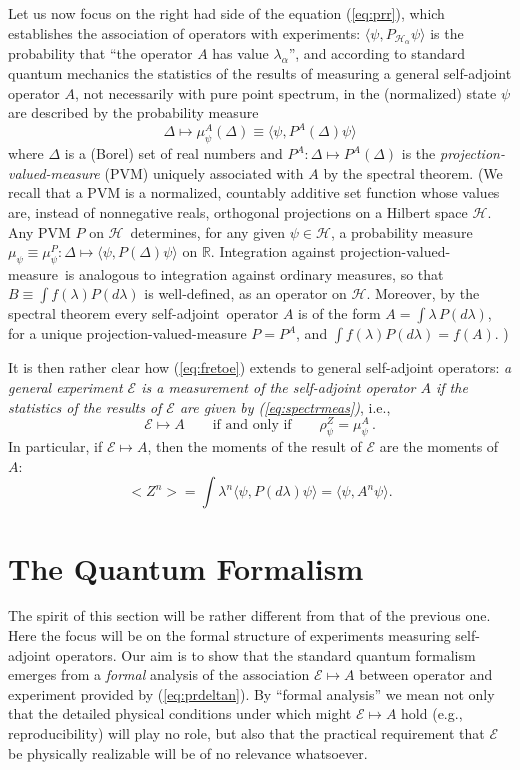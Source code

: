 \documentclass[12pt]{article}
\newcommand{\sa}{self-adjoint}
\newcommand{\PV}{projection-valued-measure}
\renewcommand{\a}{\alpha}
\newcommand{\la}{\lambda_{\a}}
\renewcommand{\H}{\mbox{$\mathcal{H}$}}
\newcommand{\Pa}{ P_{ {\mathcal{H}_{\a} } } }
\newcommand{\R}{\mathbb{R}}
\newcommand{\E}{\mbox{$\mathscr{E}$}}
\begin{document}
Let us now focus on the right had side of the equation (\ref{eq:prr}),
which establishes the association of operators with experiments:
$\langle\psi,\Pa \psi \rangle$ is the probability that ``the operator
$A $ has value $\la$'', and according to standard quantum mechanics
the statistics of the results of measuring a general \sa{} operator
$A$, not necessarily with pure point spectrum, in the (normalized)
state $\psi$ are described by the probability measure
\begin{equation}
   \Delta\mapsto\mu^{A}_\psi(\Delta) \equiv \langle \psi,
P^{A }(\Delta) \psi \rangle
\label{eq:spectrmeas}
\end{equation}
where $\Delta$ is a (Borel) set of real numbers and $P^A:
\Delta\mapsto P^{A }(\Delta)$ is the \emph{projection-valued-measure}
(PVM) uniquely associated with $A$ by the spectral theorem.  (We
recall \cite{RS80} that a PVM is a normalized, countably additive set
function whose values are, instead of nonnegative reals, orthogonal
projections on a Hilbert space \H{}.  Any PVM $P$ on \H\ determines,
for any given $\psi\in \H$, a probability measure
$\mu_\psi\equiv\mu_\psi^P : \Delta \mapsto \langle\psi ,
P(\Delta)\psi\rangle$ on $\R$.  Integration against \PV\ is analogous
to integration against ordinary measures, so that $B\equiv \int
f(\lambda) P(d\lambda) $ is well-defined, as an operator on $\H$.
Moreover, by the spectral theorem every \sa\ operator $A$ is of the
form $ A= \int \lambda\, P(d\lambda)$, for a unique \PV{} $ P =P^{A}$,
and $\int f(\lambda) P(d\lambda)= f(A)$. )

It is then rather clear how (\ref{eq:fretoe}) extends to general \sa{}
operators: \emph{a general experiment \E{} is a measurement of the
   \sa{} operator $A$ if the statistics of the results of \E{} are
   given by (\ref{eq:spectrmeas})}, i.e.,
\begin{equation}
\E\mapsto A \qquad
\mbox{if and only if}\qquad \rho^{ Z}_{\psi} =\mu^A_\psi \,.
\label{eq:prdeltan}
\end{equation}
In particular, if $\E\mapsto A $, then the moments of the result of
$\E$ are the moments of $A$:
$$
<Z^n>= \int \lambda^n \langle\psi ,P(d\lambda)\psi\rangle=
\langle\psi ,A^n\psi\rangle.  $$

   \section{The Quantum Formalism} \setcounter{equation}{0} The spirit of
   this section will be rather different {}from that of the previous
   one.  Here the focus will be on the formal structure of experiments
   measuring self-adjoint operators.  Our aim is to show that the
   standard quantum formalism emerges {}from a \emph{formal} analysis
   of the association $\E\mapsto A$ between operator and experiment
   provided by (\ref{eq:prdeltan}).  By ``formal analysis'' we mean not
   only that the detailed physical conditions under which might
   $\E\mapsto A$ hold (e.g., reproducibility) will play no role, but
   also that the practical requirement that \E{} be physically
   realizable will be of no relevance whatsoever.
\end{document}

